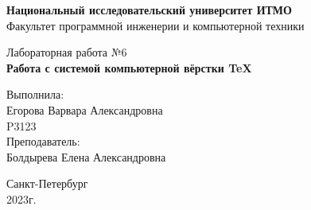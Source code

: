 \thispagestyle{empty}
\begin{center}
    {\bfseries Национальный исследовательский университет ИТМО}\\
    Факультет программной инженерии и компьютерной техники

    \vspace{20em}

    {\large Лабораторная работа №6}\\
    {\Large \textbf{Работа с системой компьютерной вёрстки \TeX}}
\end{center}

\vspace{15em}

\begin{flushright}
\rule[-3ex]{0pt}{0pt}
    Выполнила:\\
    Егорова Варвара Александровна\\
    P3123\\
    Преподаватель:\\
    Болдырева Елена Александровна\\

\end{flushright}

\vspace{\fill}

\begin{center}
Санкт-Петербург\\
2023г.
\end{center}